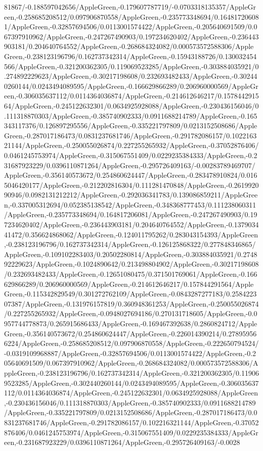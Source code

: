 {\begin{tikzternal}
{81867/-0.188597042656/AppleGreen,-0.179607787719/-0.0703318135357/AppleGreen,-0.258685208512/0.097906870558/AppleGreen,-0.235773348694/0.164817206081/AppleGreen,-0.32857694506/0.0113001574422/AppleGreen,-0.205640691509/0.067397910962/AppleGreen,-0.247267490903/0.197234620402/AppleGreen,-0.236443903181/0.204640764552/AppleGreen,-0.268684324082/0.000573572588306/AppleGreen,-0.238123196796/0.162737342314/AppleGreen,-0.15943188726/0.130032454566/AppleGreen,-0.321200362305/0.119069523285/AppleGreen,-0.303884035921/0.274892229623/AppleGreen,-0.30217198608/0.232693482433/AppleGreen,-0.302440260144/0.0243494089595/AppleGreen,-0.166629866289/0.206960000569/AppleGreen,-0.306035637112/0.0114364036874/AppleGreen,-0.214612646217/0.157844291564/AppleGreen,-0.245122632301/0.0634925928088/AppleGreen,-0.230436156046/0.111318870303/AppleGreen,-0.385740902333/0.0911688214789/AppleGreen,-0.165343117376/0.126897295556/AppleGreen,-0.335221797809/0.0213152508686/AppleGreen,-0.287017186473/0.0831237681746/AppleGreen,-0.291782086157/0.102216321144/AppleGreen,-0.250055026874/0.227255265932/AppleGreen,-0.37052876406/0.0461245753974/AppleGreen,-0.315067551409/0.0229235384333/AppleGreen,-0.231687923229/0.0396110871264/AppleGreen,-0.295726409163/-0.00283789469707/AppleGreen,-0.356140573672/0.254860624447/AppleGreen,-0.283478910824/0.0165046420177/AppleGreen,-0.212202816304/0.111281470848/AppleGreen,-0.261992090946/0.0982131212212/AppleGreen,-0.292036341783/0.139086859211/AppleGreen,-0.337005312694/0.052385138542/AppleGreen,-0.348368777453/0.111238060311/AppleGreen,-0.235773348694/0.164817206081/AppleGreen,-0.247267490903/0.197234620402/AppleGreen,-0.236443903181/0.204640764552/AppleGreen,-0.137903441472/0.356624868062/AppleGreen,-0.124011795262/0.283043154393/AppleGreen,-0.238123196796/0.162737342314/AppleGreen,-0.126125868322/0.277848346865/AppleGreen,-0.109102283403/0.20502280814/AppleGreen,-0.303884035921/0.274892229623/AppleGreen,-0.1024890642/0.213498804902/AppleGreen,-0.30217198608/0.232693482433/AppleGreen,-0.12651080475/0.371501769061/AppleGreen,-0.166629866289/0.206960000569/AppleGreen,-0.214612646217/0.157844291564/AppleGreen,-0.115342829549/0.301272762109/AppleGreen,-0.0843287277183/0.258422307387/AppleGreen,-0.131976157819/0.360948361253/AppleGreen,-0.250055026874/0.227255265932/AppleGreen,-0.0948027694186/0.270131718605/AppleGreen,-0.0957744778873/0.265915686433/AppleGreen,-0.169467392638/0.2860824712/AppleGreen,-0.356140573672/0.254860624447/AppleGreen,-0.226014390214/0.278959566224/AppleGreen,-0.258685208512/0.097906870558/AppleGreen,-0.222650794524/-0.0319109968887/AppleGreen,-0.32857694506/0.0113001574422/AppleGreen,-0.205640691509/0.067397910962/AppleGreen,-0.268684324082/0.000573572588306/AppleGreen,-0.238123196796/0.162737342314/AppleGreen,-0.321200362305/0.119069523285/AppleGreen,-0.302440260144/0.0243494089595/AppleGreen,-0.306035637112/0.0114364036874/AppleGreen,-0.245122632301/0.0634925928088/AppleGreen,-0.230436156046/0.111318870303/AppleGreen,-0.385740902333/0.0911688214789/AppleGreen,-0.335221797809/0.0213152508686/AppleGreen,-0.287017186473/0.0831237681746/AppleGreen,-0.291782086157/0.102216321144/AppleGreen,-0.37052876406/0.0461245753974/AppleGreen,-0.315067551409/0.0229235384333/AppleGreen,-0.231687923229/0.0396110871264/AppleGreen,-0.295726409163/-0.0028}
\end{tikzternal}}
